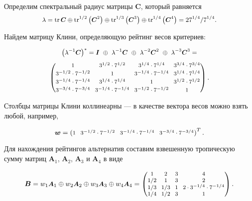 \documentclass{math-mech-sci}
\begin{document}
Определим спектральный радиус матрицы $\boldsymbol{C}$, который равняется
\[
\small
\lambda=\operatorname{tr} \boldsymbol{C} \oplus \operatorname{tr}^{1 / 2}\left(\boldsymbol{C}^2\right) \oplus \operatorname{tr}^{1 / 3}\left(\boldsymbol{C}^3\right) \oplus \operatorname{tr}^{1 / 4}\left(\boldsymbol{C}^4\right) = 27^{1 / 4}/7^{1/4}.
\]

Найдем матрицу Клини, определяющую рейтинг весов критериев:

$$
\small
\left(\lambda^{-1} \boldsymbol{C}\right)^*=\boldsymbol{I} \ \oplus\  \lambda^{-1}\boldsymbol{C} \ \oplus \ \lambda^{-2}\boldsymbol{C}^2\ \oplus \ \lambda^{-3}\boldsymbol{C}^3 = 
$$
\[
\setlength{\arraycolsep}{3.5pt}
\footnotesize
\begin{pmatrix}
			{1} & 3^{1 / 2} \cdot 7^ {1 / 2} & 3^{1 / 4} \cdot 7^ {1 / 4} & 3^ {3 / 4}\cdot 7^ {3 / 4} \\[0.5ex]
			3^{-1 / 2} \cdot 7^ {-1 / 2} & {1} & 3^{- 1 / 4} \cdot 7^ {- 1 / 4} & 3^{1 / 4} \cdot 7^ {1 / 4} \\[0.5ex]
			3^{-1 / 4} \cdot 7^ {- 1 / 4} & 3^{1 / 4} \cdot 7^ {1 / 4} & {1} & 3^{1 / 2} \cdot 7^ {1 / 2} \\[0.5ex]
			 3^ {- 3 / 4}\cdot 7^ {- 3 / 4} & 3^{- 1 / 4} \cdot 7^ {- 1 / 4} & 3^{- 1 / 2} \cdot 7^ {- 1 / 2} & {1} \\
		\end{pmatrix}.
\]
\vspace{1ex}

Столбцы матрицы Клини коллинеарны --- в качестве вектора весов можно взять любой, например,

$$
\boldsymbol{w}=
\setlength{\arraycolsep}{3.5pt}
\footnotesize
\begin{pmatrix}
1 & 3^ {- 1 / 2}\cdot 7^ {- 1 / 2} & 3^ {- 1 / 4}\cdot 7^ {- 1 / 4} & 3^ {- 3 / 4}\cdot 7^ {- 3 / 4}
\end{pmatrix}^T.
$$
\vspace{0.2ex}

Для нахождения рейтингов альтернатив составим взвешенную тропическую сумму матриц $\boldsymbol{A}_1$, $\boldsymbol{A}_2$, $\boldsymbol{A}_3$ и  $\boldsymbol{A}_4$  в виде

\[
\boldsymbol{B}\small =w_1 \boldsymbol{A}_1 \oplus w_2 \boldsymbol{A}_2\oplus w_3 \boldsymbol{A}_3 \oplus w_4\boldsymbol{A}_4= 	
\setlength{\arraycolsep}{3.5pt}
\footnotesize
\begin{pmatrix}
			{1}{} & {{2}}{} & {{3}}{} & {{4}}{} \\
			{1} / {{2}} & {1}{} & {{3}}{} & {{2}}{} \\
			{1} / {{3}} & {1} / {{3}} & {1}{} & {{2}} \cdot   {{3^ {-1 / 4}}} \cdot {{7^ {-1 / 4}}}  \\
			{1} / {{4}} & {1} / {{2}} & {{3}}{} & {1}{} \\
		\end{pmatrix}.
\]
\newpage
\end{document}
